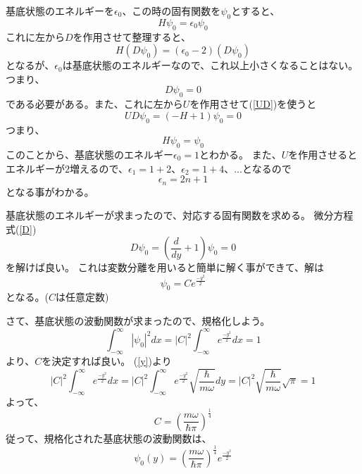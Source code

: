 基底状態のエネルギーを$\epsilon_0$、この時の固有関数を$\psi_0$とすると、
\begin{equation}
  H\psi_0 = \epsilon_0\psi_0
\end{equation}
これに左から$D$を作用させて整理すると、
\begin{equation}
  H(D\psi_0) = (\epsilon_0 - 2)(D\psi_0)
\end{equation}
となるが、$\epsilon_0$は基底状態のエネルギーなので、これ以上小さくなることはない。
つまり、
\begin{equation}
  \label{D}
  D\psi_0 = 0
\end{equation}
である必要がある。また、これに左から$U$を作用させて(\ref{UD})を使うと
\begin{equation}
  UD\psi_0 = (-H+1)\psi_0 = 0
\end{equation}
つまり、
\begin{equation}
  H\psi_0 = \psi_0
\end{equation}
このことから、基底状態のエネルギー$\epsilon_0 = 1$とわかる。
また、$U$を作用させるとエネルギーが$2$増えるので、$\epsilon_1 = 1+2$、$\epsilon_2 = 1+4$、$\ldots$となるので
\begin{equation}
  \label{eps_requirement2}
  \epsilon_n = 2n + 1
\end{equation}
となる事がわかる。

基底状態のエネルギーが求まったので、対応する固有関数を求める。
微分方程式(\ref{D})
\begin{equation}
  D\psi_0 = \left( \dfrac{d}{dy} +1 \right)\psi_0 = 0
\end{equation}
を解けば良い。
これは変数分離を用いると簡単に解く事ができて、解は
\begin{equation}
  \psi_0 = Ce^{\frac{-y^2}{2}}
\end{equation}
となる。($C$は任意定数)

さて、基底状態の波動関数が求まったので、規格化しよう。
\begin{equation}
  \int_{-\infty}^\infty |\psi_0|^2 dx = |C|^2 \int_{-\infty}^\infty e^{\frac{-y^2}{2}} dx = 1
\end{equation}
より、$C$を決定すれば良い。
(\ref{y})より
\begin{equation}
  |C|^2 \int_{-\infty}^\infty e^{\frac{-y^2}{2}} dx = |C|^2 \int_{-\infty}^\infty e^{\frac{-y^2}{2}} \sqrt{\dfrac{\hbar}{m\omega}}dy
  = |C|^2\sqrt{\dfrac{\hbar}{m\omega}}\sqrt{\pi} = 1
\end{equation}
よって、
\begin{equation}
  C = \left( \dfrac{m\omega}{\hbar\pi} \right)^\frac{1}{4}
\end{equation}
従って、規格化された基底状態の波動関数は、
\begin{equation}
  \psi_0(y) = \left( \dfrac{m\omega}{\hbar\pi} \right)^\frac{1}{4}e^{\frac{-y^2}{2}}
\end{equation}

